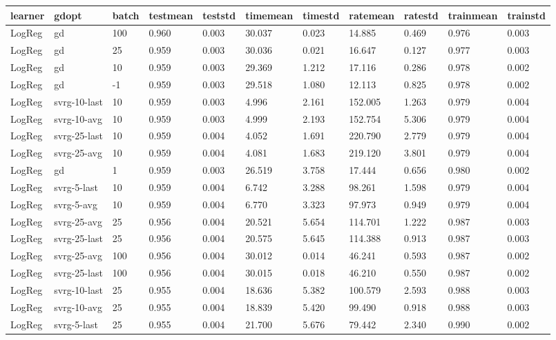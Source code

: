 \documentclass[margin={10pt 10pt 10pt 10pt}]{standalone}
\begin{document}
\begin{tabular}{lllllllllll}
    learner & gdopt & batch & testmean & teststd & timemean & timestd & ratemean & ratestd & trainmean & trainstd \\
    \midrule
    LogReg & gd & 100 & 0.960 & 0.003 & 30.037 & 0.023 & 14.885 & 0.469 & 0.976 & 0.003 \\
    LogReg & gd & 25 & 0.959 & 0.003 & 30.036 & 0.021 & 16.647 & 0.127 & 0.977 & 0.003 \\
    LogReg & gd & 10 & 0.959 & 0.003 & 29.369 & 1.212 & 17.116 & 0.286 & 0.978 & 0.002 \\
    LogReg & gd & -1 & 0.959 & 0.003 & 29.518 & 1.080 & 12.113 & 0.825 & 0.978 & 0.002 \\
    LogReg & svrg-10-last & 10 & 0.959 & 0.003 & 4.996 & 2.161 & 152.005 & 1.263 & 0.979 & 0.004 \\
    LogReg & svrg-10-avg & 10 & 0.959 & 0.003 & 4.999 & 2.193 & 152.754 & 5.306 & 0.979 & 0.004 \\
    LogReg & svrg-25-last & 10 & 0.959 & 0.004 & 4.052 & 1.691 & 220.790 & 2.779 & 0.979 & 0.004 \\
    LogReg & svrg-25-avg & 10 & 0.959 & 0.004 & 4.081 & 1.683 & 219.120 & 3.801 & 0.979 & 0.004 \\
    LogReg & gd & 1 & 0.959 & 0.003 & 26.519 & 3.758 & 17.444 & 0.656 & 0.980 & 0.002 \\
    LogReg & svrg-5-last & 10 & 0.959 & 0.004 & 6.742 & 3.288 & 98.261 & 1.598 & 0.979 & 0.004 \\
    LogReg & svrg-5-avg & 10 & 0.959 & 0.004 & 6.770 & 3.323 & 97.973 & 0.949 & 0.979 & 0.004 \\
    LogReg & svrg-25-avg & 25 & 0.956 & 0.004 & 20.521 & 5.654 & 114.701 & 1.222 & 0.987 & 0.003 \\
    LogReg & svrg-25-last & 25 & 0.956 & 0.004 & 20.575 & 5.645 & 114.388 & 0.913 & 0.987 & 0.003 \\
    LogReg & svrg-25-avg & 100 & 0.956 & 0.004 & 30.012 & 0.014 & 46.241 & 0.593 & 0.987 & 0.002 \\
    LogReg & svrg-25-last & 100 & 0.956 & 0.004 & 30.015 & 0.018 & 46.210 & 0.550 & 0.987 & 0.002 \\
    LogReg & svrg-10-last & 25 & 0.955 & 0.004 & 18.636 & 5.382 & 100.579 & 2.593 & 0.988 & 0.003 \\
    LogReg & svrg-10-avg & 25 & 0.955 & 0.004 & 18.839 & 5.420 & 99.490 & 0.918 & 0.988 & 0.003 \\
    LogReg & svrg-5-last & 25 & 0.955 & 0.004 & 21.700 & 5.676 & 79.442 & 2.340 & 0.990 & 0.002 \\

\end{tabular}
\end{document}
